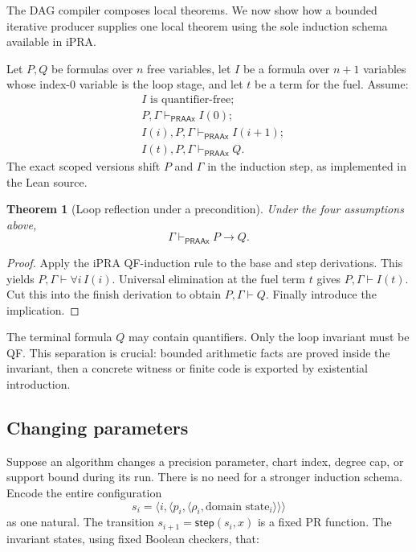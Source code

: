 \documentclass[11pt]{article}
\newtheorem{theorem}{Theorem}[section]
\newcommand{\PRAAx}{\mathsf{PRAAx}}
\newcommand{\pair}[2]{\langle #1,#2\rangle}
\begin{document}
The DAG compiler composes local theorems.  We now show how a bounded iterative
producer supplies one local theorem using the sole induction schema available
in iPRA.

Let \(P,Q\) be formulas over \(n\) free variables, let
\(I\) be a formula over \(n+1\) variables whose index-0 variable is the loop
stage, and let \(t\) be a term for the fuel.  Assume:
\begin{align*}
  & I\text{ is quantifier-free};\\
  & P,\Gamma\vdash_{\PRAAx} I(0);\\
  & I(i),P,\Gamma\vdash_{\PRAAx}I(i+1);\\
  & I(t),P,\Gamma\vdash_{\PRAAx}Q.
\end{align*}
The exact scoped versions shift \(P\) and \(\Gamma\) in the induction step, as
implemented in the Lean source.

\begin{theorem}[Loop reflection under a precondition]
\label{thm:loop}
Under the four assumptions above,
\[
  \Gamma\vdash_{\PRAAx}P\to Q.
\]
\end{theorem}

\begin{proof}
Apply the iPRA QF-induction rule to the base and step derivations.  This yields
\(P,\Gamma\vdash\forall i\,I(i)\).  Universal elimination at the fuel term
\(t\) gives \(P,\Gamma\vdash I(t)\).  Cut this into the finish derivation to
obtain \(P,\Gamma\vdash Q\).  Finally introduce the implication.
\end{proof}

The terminal formula \(Q\) may contain quantifiers.  Only the loop invariant
must be QF.  This separation is crucial: bounded arithmetic facts are proved
inside the invariant, then a concrete witness or finite code is exported by
existential introduction.

\subsection{Changing parameters}

Suppose an algorithm changes a precision parameter, chart index, degree cap,
or support bound during its run.  There is no need for a stronger induction
schema.  Encode the entire configuration
\[
  s_i=\pair{i}{\pair{p_i}{\pair{\rho_i}{\text{domain state}_i}}}
\]
as one natural.  The transition \(s_{i+1}=\mathsf{step}(s_i,x)\) is a fixed PR
function.  The invariant states, using fixed Boolean checkers, that:
\end{document}
